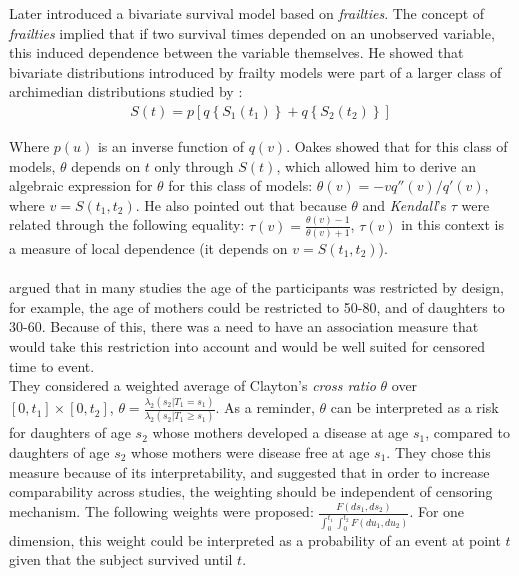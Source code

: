 \documentclass[]{article}
\begin{document}
Later \cite{oakes1989bivariate} introduced a bivariate survival model based on \emph{frailties}. The concept of \emph{frailties} implied that if two survival times depended on an unobserved variable, this induced dependence between the variable themselves. He showed that bivariate distributions introduced by frailty models were part of a larger class of archimedian distributions studied by \cite{genest1986copules}:
$$
\begin{aligned}
	S(t) = p\left[ q\left\{ S_1(t_1) \right\}  + q\left\{ S_2(t_2) \right\}  \right]
\end{aligned}
$$

Where $p(u)$ is an inverse function of $q(v)$. Oakes showed that for this class of models, $\theta$ depends on $t$ only through $S(t)$, which allowed him to derive an algebraic expression for $\theta$ for this class of models:  $\theta(v) = -vq''(v)/q'(v)$, where $v=S(t_1, t_2)$. He also pointed out that because $\theta$ and \emph{Kendall}'s $\tau$ were related through the following equality: $\tau(v) = \frac{\theta(v)-1}{\theta(v)+1}$, $\tau(v)$ in this context is a measure of local dependence (it depends on $v=S(t_1, t_2)$).\\
~\\

\cite{fan2000dependence} argued that in many studies the age of the participants was restricted by design, for example, the age of mothers could be restricted to 50-80, and of daughters to 30-60. Because of this, there was a need to have an association measure that would take this restriction into account and would be well suited for censored time to event. \\
They considered a weighted average of Clayton's \textit{cross ratio} $\theta$ over $[0,t_1] \times [0, t_2]$, $\theta = \frac{ \lambda_2(s_2|T_1=s_1)}{\lambda_2(s_2|T_1 \geq s_1)}$. As a reminder, $\theta$ can be interpreted as a risk for daughters of age $s_2$ whose mothers developed a disease at age $s_1$, compared to daughters of age $s_2$ whose mothers were disease free at age $s_1$. They chose this measure because of its interpretability, and suggested that in order to increase comparability across studies, the weighting should be independent of censoring mechanism. The following weights were proposed: $\frac{F(ds_1,ds_2)}{\int_0^{t_1}\int_0^{t_2} F(du_1, du_2)}$. For one dimension, this weight could be interpreted as a probability of an event at point $t$ given that the subject survived until $t$.\\
\end{document}
